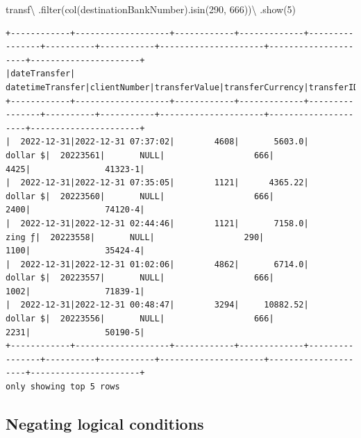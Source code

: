 \documentclass[
  11pt,
  letterpaper,
  DIV=11,
  numbers=noendperiod]{scrreprt}
\newenvironment{Shaded}{\begin{snugshade}}{\end{snugshade}}
\newcommand{\BuiltInTok}[1]{\textcolor[rgb]{0.00,0.23,0.31}{#1}}
\newcommand{\DecValTok}[1]{\textcolor[rgb]{0.68,0.00,0.00}{#1}}
\newcommand{\NormalTok}[1]{\textcolor[rgb]{0.00,0.23,0.31}{#1}}
\newcommand{\OperatorTok}[1]{\textcolor[rgb]{0.37,0.37,0.37}{#1}}
\newcommand{\StringTok}[1]{\textcolor[rgb]{0.13,0.47,0.30}{#1}}
\begin{document}
\begin{Shaded}
\begin{Highlighting}[]
\NormalTok{transf}\OperatorTok{\textbackslash{}}
\NormalTok{  .}\BuiltInTok{filter}\NormalTok{(col(}\StringTok{\textquotesingle{}destinationBankNumber\textquotesingle{}}\NormalTok{).isin(}\DecValTok{290}\NormalTok{, }\DecValTok{666}\NormalTok{))}\OperatorTok{\textbackslash{}}
\NormalTok{  .show(}\DecValTok{5}\NormalTok{)}
\end{Highlighting}
\end{Shaded}

\begin{verbatim}
+------------+-------------------+------------+-------------+----------------+----------+-----------+---------------------+---------------------+----------------------+
|dateTransfer|   datetimeTransfer|clientNumber|transferValue|transferCurrency|transferID|transferLog|destinationBankNumber|destinationBankBranch|destinationBankAccount|
+------------+-------------------+------------+-------------+----------------+----------+-----------+---------------------+---------------------+----------------------+
|  2022-12-31|2022-12-31 07:37:02|        4608|       5603.0|        dollar $|  20223561|       NULL|                  666|                 4425|               41323-1|
|  2022-12-31|2022-12-31 07:35:05|        1121|      4365.22|        dollar $|  20223560|       NULL|                  666|                 2400|               74120-4|
|  2022-12-31|2022-12-31 02:44:46|        1121|       7158.0|          zing ƒ|  20223558|       NULL|                  290|                 1100|               35424-4|
|  2022-12-31|2022-12-31 01:02:06|        4862|       6714.0|        dollar $|  20223557|       NULL|                  666|                 1002|               71839-1|
|  2022-12-31|2022-12-31 00:48:47|        3294|     10882.52|        dollar $|  20223556|       NULL|                  666|                 2231|               50190-5|
+------------+-------------------+------------+-------------+----------------+----------+-----------+---------------------+---------------------+----------------------+
only showing top 5 rows
\end{verbatim}

\hypertarget{negating-logical-conditions}{%
\subsection{Negating logical
conditions}\label{negating-logical-conditions}}
\end{document}
